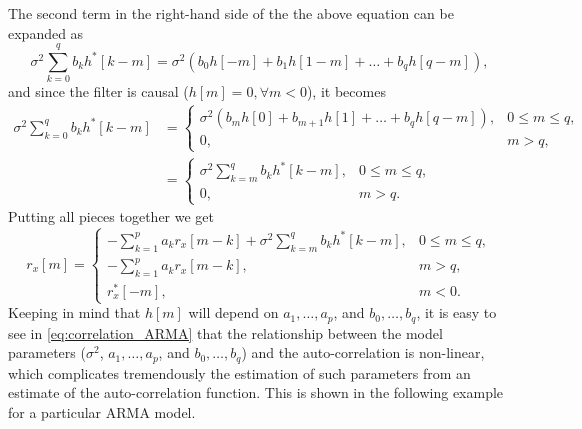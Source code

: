 The second term in the right-hand side of the the above equation can be expanded as
\begin{equation}
\sigma^2 \sum_{k = 0}^{q} b_k  h^{\ast}[k-m] = \sigma^2  \left(b_0 h[-m] + b_1 h[1-m] + \ldots + b_q h[q-m]\right),
\end{equation}
and since the filter is causal ($h[m] = 0, \forall m<0$), it becomes
\begin{align}
\sigma^2  \sum_{k = 0}^{q} b_k  h^{\ast}[k-m] &= \begin{cases}
\sigma^2  \left(b_m h[0] + b_{m+1} h[1] + \ldots + b_q h[q-m]\right), & 0 \leq  m \leq q, \\ 
0, & m > q,
\end{cases} \nonumber \\
&= \begin{cases}
\displaystyle \sigma^2  \sum_{k = m}^{q} b_k  h^{\ast}[k-m], & 0 \leq  m \leq q, \\ 
0, & m > q.
\end{cases}
\end{align}
Putting all pieces together we get
\begin{equation}
\label{eq:correlation_ARMA}
r_{x}[m] = \begin{cases}
\displaystyle - \sum_{k = 1}^{p} a_k r_{x}[m-k] + \sigma^2  \sum_{k = m}^{q} b_k  h^{\ast}[k-m], & 0 \leq  m \leq q, \\ 
\displaystyle  - \sum_{k = 1}^{p} a_k r_{x}[m-k], & m > q, \\
r_{x}^{\ast}[-m], & m < 0.
\end{cases}
\end{equation}
Keeping in mind that $h[m]$ will depend on $a_1, \ldots, a_p$, and $b_0, \ldots, b_q$, it is easy to see in \eqref{eq:correlation_ARMA} that the relationship between the model parameters ($\sigma^2$, $a_1, \ldots, a_p$, and $b_0, \ldots, b_q$) and the auto-correlation is non-linear, which complicates tremendously the estimation of such parameters from an estimate of the auto-correlation function. This is shown in the following example for a particular ARMA model.


